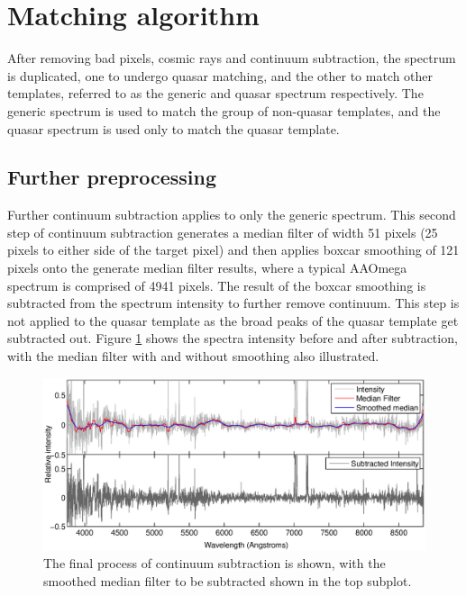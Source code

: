 \documentclass[titlesmallcaps, examinerscopy, copyrightpage]{uqthesis}
\begin{document}
\section{Matching algorithm}

After removing bad pixels, cosmic rays and continuum subtraction, the spectrum is duplicated, one to undergo quasar matching, and the other to match other templates, referred to as the generic and quasar spectrum respectively. The generic spectrum is used to match the group of non-quasar templates, and the quasar spectrum is used only to match the quasar template.

\subsection{Further preprocessing}

Further continuum subtraction applies to only the generic spectrum. This second step of continuum subtraction generates a median filter of width 51 pixels (25 pixels to either side of the target pixel) and then applies boxcar smoothing of 121 pixels onto the generate median filter results, where a typical AAOmega spectrum is comprised of 4941 pixels. The result of the boxcar smoothing is subtracted from the spectrum intensity to further remove continuum. This step is not applied to the quasar template as the broad peaks of the quasar template get subtracted out. Figure \ref{fig:smooth} shows the spectra intensity before and after subtraction, with the median filter with and without smoothing also illustrated.\\
\begin{figure}[ht!]
\includegraphics[width=\textwidth]{images/smoothing.eps} 
\centering
\caption{The final process of continuum subtraction is shown, with the smoothed median filter to be subtracted shown in the top subplot.}
\label{fig:smooth}
\end{figure}
\end{document}
